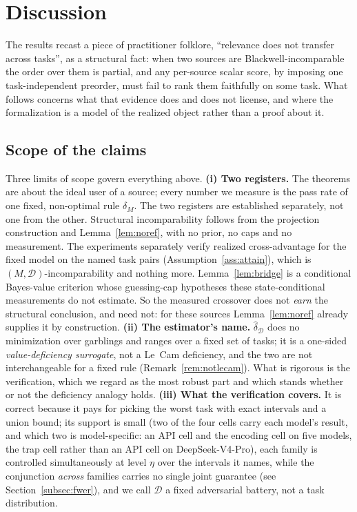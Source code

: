\documentclass[11pt]{article}
\theoremstyle{plain}
\theoremstyle{definition}
\theoremstyle{remark}
\newcommand{\dhat}{\widehat{\delta}}
\newcommand{\Dcal}{\mathcal{D}}
\begin{document}
\section{Discussion}
\label{sec:discussion}

The results recast a piece of practitioner folklore, ``relevance does not transfer across tasks'',
as a structural fact: when two sources are Blackwell-incomparable the order over them is partial,
and any per-source scalar score, by imposing one task-independent preorder, must fail to rank them
faithfully on some task. What follows
concerns what that evidence does and does not license, and where the formalization is a model of
the realized object rather than a proof about it.

\subsection{Scope of the claims}
\label{sec:disc-bridge}\label{sec:disc-deficiency}\label{sec:disc-certificate}

Three limits of scope govern everything above. \textbf{(i) Two registers.} The theorems are about
the ideal user of a source; every number we measure is the pass rate of one fixed, non-optimal
rule $\delta_M$. The two registers are established separately, not one from the other. Structural
incomparability follows from the projection construction and Lemma~\ref{lem:noref}, with no prior,
no caps and no measurement. The experiments separately verify realized cross-advantage for the
fixed model on the named task pairs (Assumption~\ref{ass:attain}), which is
$(M,\Dcal)$-incomparability and nothing more. Lemma~\ref{lem:bridge} is a conditional
Bayes-value criterion whose guessing-cap hypotheses these state-conditional measurements do not
estimate. So the measured crossover does not \emph{earn} the structural conclusion, and need
not: for these sources Lemma~\ref{lem:noref} already supplies it by construction. \textbf{(ii) The estimator's name.} $\dhat_{\Dcal}$ does no minimization
over garblings and ranges over a fixed set of tasks; it is a one-sided \emph{value-deficiency
surrogate}, not a Le~Cam deficiency, and the two are not interchangeable for a fixed rule
(Remark~\ref{rem:notlecam}). What is rigorous is the verification, which we regard as the most
robust part and which stands whether or not the deficiency analogy holds. \textbf{(iii) What the
verification covers.} It is correct because it pays for picking the worst task with exact intervals
and a union bound; its support is small (two of the four cells carry each model's result, and
which two is model-specific: an API cell and the encoding cell on five models, the trap cell
rather than an API cell on DeepSeek-V4-Pro), each family is controlled simultaneously at level
$\eta$ over the intervals it names, while the conjunction \emph{across} families carries no single
joint guarantee (see Section~\ref{subsec:fwer}), and we call $\Dcal$ a fixed adversarial battery,
not a task distribution.
\end{document}

